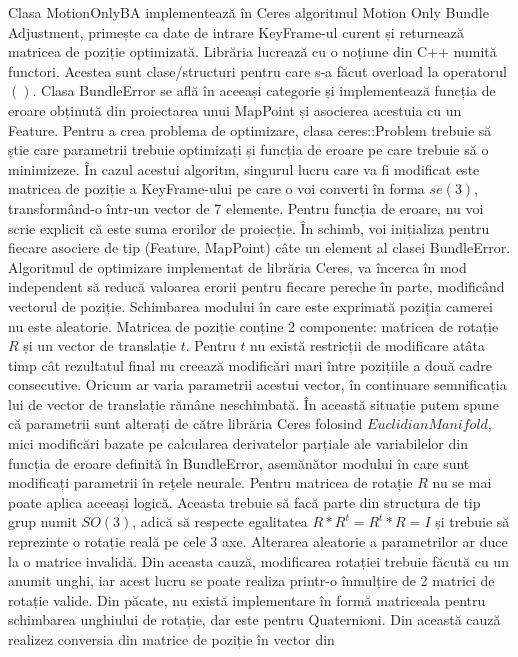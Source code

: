 \documentclass[12pt,a4paper]{report}
\begin{document}
Clasa MotionOnlyBA implementează în Ceres algoritmul Motion Only Bundle Adjustment,
primește ca date de intrare KeyFrame-ul curent și returnează matricea de poziție optimizată.
Librăria lucrează cu o noțiune din C++ numită functori. Acestea sunt clase/structuri pentru
care s-a făcut overload la operatorul $ () $. Clasa BundleError se află în aceeași categorie
și implementează funcția de eroare obținută din proiectarea unui MapPoint și asocierea 
acestuia cu un Feature. Pentru a crea problema de optimizare, clasa ceres::Problem trebuie 
să știe care parametrii trebuie optimizați și funcția de eroare pe care trebuie să o minimizeze.
În cazul acestui algoritm, singurul lucru care va fi modificat este matricea de poziție a KeyFrame-ului
pe care o voi converti în forma $ se(3) $, transformând-o într-un vector de 7 elemente. Pentru 
funcția de eroare, nu voi scrie explicit că este suma erorilor de proiecție. În schimb, voi inițializa pentru
fiecare asociere de tip (Feature, MapPoint) câte un element al clasei BundleError. Algoritmul de 
optimizare implementat de librăria Ceres, va încerca în mod independent să reducă valoarea erorii 
pentru fiecare pereche în parte, modificând vectorul de poziție. Schimbarea modului în care este 
exprimată poziția camerei nu este aleatorie. Matricea de poziție conține 2 componente:
matricea de rotație $ R $ și un vector de translație $ t $. Pentru $ t $ nu există restricții 
de modificare atâta timp cât rezultatul final nu creează modificări mari între pozițiile a două cadre
consecutive. Oricum ar varia parametrii acestui vector, în continuare semnificația
lui de vector de translație rămâne neschimbată. În această situație putem spune că parametrii 
sunt alterați de către librăria Ceres folosind $ EuclidianManifold $, mici modificări bazate pe
calcularea derivatelor parțiale ale variabilelor din funcția de eroare definită în BundleError, asemănător 
modului în care sunt modificați parametrii în rețele neurale. Pentru matricea de rotație $ R $ nu se 
mai poate aplica aceeași logică. Aceasta trebuie să facă parte din structura de tip grup numit 
$ SO(3) $, adică să respecte egalitatea $ R * R^t = R^t * R = I $ și trebuie să reprezinte o rotație 
reală pe cele 3 axe. Alterarea aleatorie a parametrilor ar duce la o matrice invalidă. Din aceasta
cauză, modificarea rotației trebuie făcută cu un anumit unghi,
iar acest lucru se poate realiza printr-o înmulțire de 2 matrici de rotație valide. Din păcate, nu 
există implementare în formă matriceala pentru schimbarea unghiului de rotație, dar este pentru
Quaternioni. Din această cauză realizez conversia din matrice de poziție în vector din 
\end{document}

